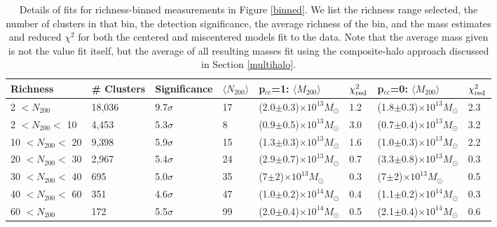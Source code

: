 \begin{landscape}

\begin{table}
  \centering
    \caption[Magnification Results for Richness-Binned Clusters]{Details of fits for richness-binned measurements in Figure \ref{binned}. We list the richness range selected, the number of clusters in that bin, the detection significance, the average richness of the bin, and the mass estimates and reduced $\chi^2$ for both the centered and miscentered models fit to the data. Note that the average mass given is not the value fit itself, but the average of all resulting masses fit using the composite-halo approach discussed in Section \ref{multihalo}.}
    \label{richtable}
    \begin{tabular}{llllllll}
      \hline
      Richness & \# Clusters & Significance & $\langle N_{200} \rangle$ & p$_{cc}$=1: $\langle M_{200} \rangle$ & $\chi^2_{\rm red}$ & p$_{cc}$=0: $\langle M_{200} \rangle$ & $\chi^2_{\rm red}$ \\ \hline
      2 $<N_{200}$ & 18,036 & 9.7$\sigma$ & 17 & (2.0$\pm$0.3)$\times10^{13} M_{\odot}$ & 1.2 & (1.8$\pm$0.3)$\times10^{13} M_{\odot}$ & 2.3  \\
      2 $<N_{200}<$ 10 & 4,453 & 5.3$\sigma$ & 8 & (0.9$\pm$0.5)$\times10^{13} M_{\odot}$ & 3.0 & (0.7$\pm$0.4)$\times10^{13} M_{\odot}$ & 3.2  \\
      10 $<N_{200}<$ 20 & 9,398 & 5.9$\sigma$ & 15 & (1.3$\pm$0.3)$\times10^{13} M_{\odot}$ & 1.6 & (1.0$\pm$0.3)$\times10^{13} M_{\odot}$ & 2.2  \\
      20 $<N_{200}<$ 30 & 2,967 & 5.4$\sigma$ & 24 & (2.9$\pm$0.7)$\times10^{13} M_{\odot}$ & 0.7 & (3.3$\pm$0.8)$\times10^{13} M_{\odot}$ & 0.3  \\
      30 $<N_{200}<$ 40 & 695 & 5.0$\sigma$ & 35 & (7$\pm$2)$\times10^{13} M_{\odot}$ & 0.3 & (7$\pm$2)$\times10^{13} M_{\odot}$ & 0.5  \\
      40 $<N_{200}<$ 60 & 351 & 4.6$\sigma$ & 47 & (1.0$\pm$0.2)$\times10^{14} M_{\odot}$ & 0.4 & (1.1$\pm$0.2)$\times10^{14} M_{\odot}$ & 0.3  \\
      60 $<N_{200}$ & 172 & 5.5$\sigma$ & 99 & (2.0$\pm$0.4)$\times10^{14} M_{\odot}$ & 0.5 & (2.1$\pm$0.4)$\times10^{14} M_{\odot}$ & 0.6  \\
      \hline
    \end{tabular}
\end{table}


\end{landscape}
